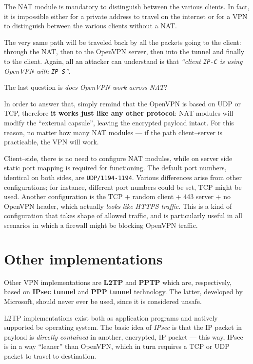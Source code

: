 \documentclass[10pt]{extreport}
\begin{document}
The NAT module is mandatory to distinguish between the various clients. In
fact, it is impossible either for a private address to travel on the internet
or for a VPN to distinguish between the various clients without a NAT.

The very same path will be traveled back by all the packets going to the
client: through the NAT, then to the OpenVPN server, then into the tunnel and
finally to the client. Again, all an attacker can understand is that
\emph{``client \texttt{IP-C} is using OpenVPN with \texttt{IP-S}''}.

The last question is \emph{does OpenVPN work across NAT}?

In order to answer that, simply remind that the OpenVPN is based on UDP or TCP,
therefore \textbf{it works just like any other protocol}: NAT modules will
modify the ``external capsule'', leaving the encrypted payload intact. For this
reason, no matter how many NAT modules --- if the path client--server is
practicable, the VPN will work.

Client--side, there is no need to configure NAT modules, while on server side
static port mapping is required for functioning. The default port numbers,
identical on both sides, are \texttt{UDP/1194-1194}. Various differences arise
from other configurations; for instance, different port numbers could be set,
TCP might be used. Another configuration is the TCP + random client + 443
server + no OpenVPN header, which actually \emph{looks like HTTPS traffic}.
This is a kind of configuration that takes shape of allowed traffic, and is
particularly useful in all scenarios in which a firewall might be blocking
OpenVPN traffic.

\section{Other implementations}

Other VPN implementations are \textbf{L2TP} and \textbf{PPTP} which are,
respectively, based on \textbf{IPsec tunnel} and \textbf{PPP tunnel}
technology. The latter, developed by Microsoft, should never ever be used,
since it is considered unsafe.

L2TP implementations exist both as application programs and natively supported
be operating system. The basic idea of \emph{IPsec} is that the IP packet in
payload is \emph{directly contained} in another, encrypted, IP packet --- this
way, IPsec is in a way ``leaner'' than OpenVPN, which in turn requires a TCP or
UDP packet to travel to destination.
\end{document}

